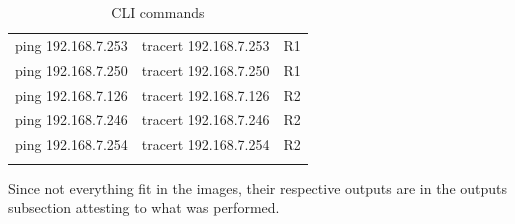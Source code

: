 \documentclass[11pt,a4paper]{report}
\begin{document}
\begin{longtable}[c]{@{}lll@{}}
            ping 192.168.7.253 & tracert 192.168.7.253 & R1              \\
            ping 192.168.7.250 & tracert 192.168.7.250 & R1              \\
            ping 192.168.7.126 & tracert 192.168.7.126 & R2              \\
            ping 192.168.7.246 & tracert 192.168.7.246 & R2              \\
            ping 192.168.7.254 & tracert 192.168.7.254 & R2              \\* \bottomrule
            \caption{CLI commands}
            \label{tab:clicommands}\\
        \end{longtable}

        Since not everything fit in the images, their respective outputs are in the outputs subsection attesting to what was performed.
\end{document}
